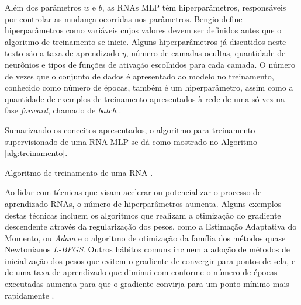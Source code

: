 Além dos parâmetros $w$ e $b$, as RNAs MLP têm hiperparâmetros, responsáveis por controlar as mudança ocorridas nos parâmetros. Bengio define hiperparâmetros como variáveis cujos valores devem ser definidos antes que o algoritmo de treinamento se inicie. Alguns hiperparâmetros já discutidos neste texto são a taxa de aprendizado $\eta$, número de camadas ocultas, quantidade de neurônios e tipos de funções de ativação escolhidos para cada camada. O número de vezes que o conjunto de dados é apresentado ao modelo no treinamento, conhecido como número de épocas, também é um hiperparâmetro, assim como a quantidade de exemplos de treinamento apresentados à rede de uma só vez na fase \emph{forward}, chamado de \emph{batch} \cite{bengio2012practical}.

Sumarizando os conceitos apresentados, o algoritmo para treinamento supervisionado de uma RNA MLP se dá como mostrado no Algoritmo \ref{alg:treinamento}.

\begin{algorithm}[h!]
	\caption{Algoritmo de treinamento de uma RNA  \cite{Teresa:Livro}.}\label{alg:treinamento}
\end{algorithm}

Ao lidar com técnicas que visam acelerar ou potencializar o processo de aprendizado RNAs, o número de hiperparâmetros aumenta. Alguns exemplos destas técnicas incluem os algoritmos que realizam a otimização do gradiente descendente através da regularização dos pesos, como a Estimação Adaptativa do Momento, ou \emph{Adam} e o algoritmo de otimização da família dos métodos quase Newtonianos \emph{L-BFGS}. Outros hábitos comuns incluem a adoção de métodos de inicialização dos pesos que evitem o gradiente de convergir para pontos de sela, e de uma  taxa de aprendizado que diminui com conforme o número de épocas executadas aumenta para que o gradiente convirja para um ponto mínimo mais rapidamente \cite{goodfellow2016deep}.

